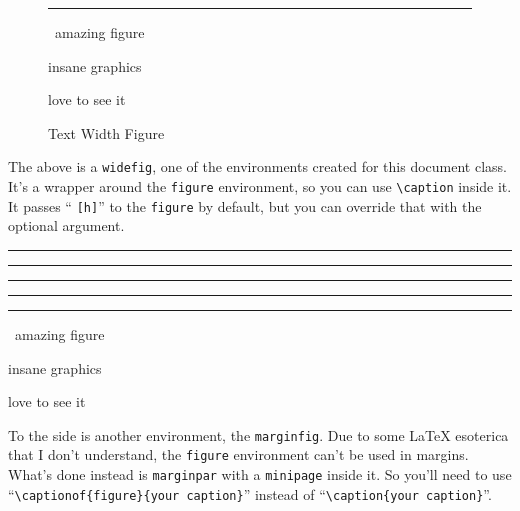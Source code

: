 \begin{chapterpage}
  \vfill
  \begin{figure}[h]
    \hrulefill\vskip1pt%
    {\color{gray5}\rule{\textwidth}{+0.4cm\relax}}%
    \vspace*{\dimexpr-47pt-0.4cm\relax}

    {\color{white}
    \ amazing figure\hfill\vskip0.2cm{\centering insane graphics\par}\vskip0.2cm\hfill love to see it\ \hbox{}\vskip1pt}\hrulefill
    \caption[Text Width Figure]{\color{gray3}Text Width Figure}
  \end{figure}
\end{chapterpage}

\noindent
The above is a \texttt{widefig}, one of the environments created for this document class.
It's a wrapper around the \texttt{figure} environment, so you can use \verb|\caption| inside it.
It passes ``\kern -1pt \texttt{[h]}\kern -1pt'' to the \texttt{figure} by default, but you can override that with the optional argument.

\begin{widefig}[t]%
  {\color{gray9}
  \rule{\widefigwidth\relax}{30ex}\hfill\color{gray7}
  \rule{\widefigwidth\relax}{30ex}\hfill\color{gray5}
  \rule{\widefigwidth\relax}{30ex}\hfill\color{gray3}
  \rule{\widefigwidth\relax}{30ex}%
}
  \vskip1pt
  \hrulefill
\end{widefig}

\begin{marginfig}
  \hrulefill\vskip1pt%
  {\color{gray8}\rule{\textwidth}{+5cm\relax}}%
  \vspace*{\dimexpr-47pt-5cm\relax}

  \ amazing figure\hfill\vskip2.5cm{\centering insane graphics\par}\vskip2.5cm\hfill love to see it\ \hbox{}\vskip1pt\hrulefill
\end{marginfig}

To the side is another environment, the \texttt{marginfig}.
Due to some \LaTeX{} esoterica that I don't understand, the \texttt{figure} environment can't be used in margins.
What's done instead is \texttt{marginpar} with a \texttt{minipage} inside it.
So you'll need to use ``\verb|\captionof{figure}{your caption}|'' instead of ``\verb|\caption{your caption}|''.

